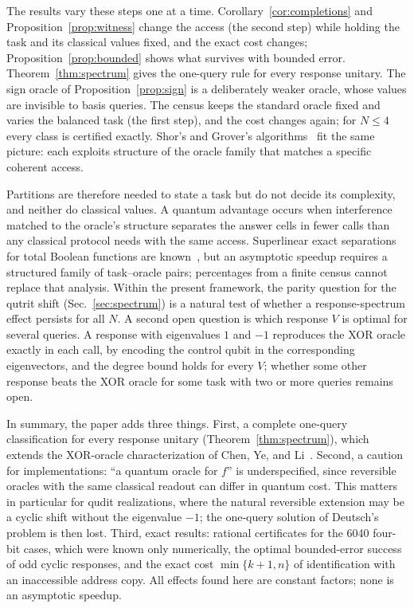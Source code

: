 \documentclass[
  aps,
  pra,
  reprint,
  nofootinbib
]{revtex4-2}
\begin{document}
The results vary these steps one at a time. Corollary~\ref{cor:completions}
and Proposition~\ref{prop:witness} change the access (the second step) while
holding the task and its classical values fixed, and the exact cost
changes; Proposition~\ref{prop:bounded} shows what survives with bounded
error. Theorem~\ref{thm:spectrum} gives the one-query rule for every response
unitary. The sign oracle of
Proposition~\ref{prop:sign} is a deliberately weaker oracle, whose
values are invisible to basis queries. The census keeps the standard oracle
fixed and varies the balanced task (the first step), and the cost changes
again; for \(N\le4\) every class is certified exactly. Shor's and Grover's
algorithms~\cite{shor:94,grover} fit the same picture: each exploits structure
of the oracle family that matches a specific coherent access.

Partitions are therefore needed to state a task but do not decide its
complexity, and neither do classical values. A quantum advantage occurs
when interference matched to the oracle's structure separates the answer cells
in fewer calls than any classical protocol needs with the same access.
Superlinear exact separations for total Boolean functions are
known~\cite{Ambainis2016SuperlinearExact}, but an asymptotic speedup requires
a structured family of task--oracle pairs; percentages from a finite census
cannot replace that analysis. Within the present framework, the parity
question for the qutrit shift (Sec.~\ref{sec:spectrum}) is a natural test of
whether a response-spectrum effect persists for all \(N\). A second open
question is which response \(V\) is optimal for several queries. A response
with eigenvalues \(1\) and \(-1\) reproduces the XOR oracle exactly in each
call, by encoding the control qubit in the corresponding eigenvectors, and the
degree bound holds for every \(V\); whether some other response beats the XOR
oracle for some task with two or more queries remains open.

In summary, the paper adds three things. First, a complete one-query
classification for every response unitary (Theorem~\ref{thm:spectrum}),
which extends the XOR-oracle
characterization of Chen, Ye, and Li~\cite{ChenYeLi2020}. Second, a caution
for implementations: ``a quantum oracle for \(f\)'' is underspecified, since
reversible oracles with the same classical readout can differ in quantum
cost. This matters in particular for qudit realizations, where the natural
reversible extension may be a cyclic shift without the eigenvalue \(-1\); the
one-query solution of Deutsch's problem is then lost. Third, exact results:
rational certificates for the 6040 four-bit cases, which were known only
numerically, the optimal bounded-error success of odd cyclic responses,
and the exact cost \(\min\{k+1,n\}\) of identification with an inaccessible
address copy. All effects found here are constant factors; none is an
asymptotic speedup.
\end{document}
